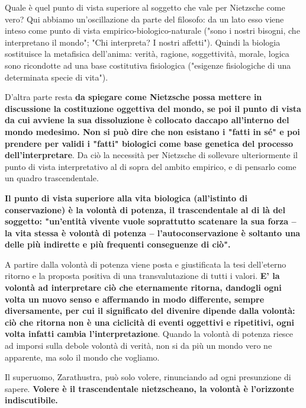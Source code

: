 Quale è quel punto di vista superiore al soggetto che vale per Nietzsche come vero? Qui abbiamo un'oscillazione da parte del filosofo: da un lato esso viene inteso come punto di vista empirico-biologico-naturale ("sono i nostri bisogni, che interpretano il mondo"; "Chi interpreta? I nostri affetti"). Quindi la biologia sostituisce la metafisica dell'anima: verità, ragione, soggettività, morale, logica sono ricondotte ad una base costitutiva fisiologica ("esigenze fisiologiche di una determinata specie di vita").

D'altra parte resta \textbf{da spiegare come Nietzsche possa mettere in discussione la costituzione oggettiva del mondo, se poi il punto di vista da cui avviene la sua dissoluzione è collocato daccapo all'interno del mondo medesimo. Non si può dire che non esistano i "fatti in sé" e poi prendere per validi i "fatti" biologici come base genetica del processo dell'interpretare}. Da ciò la necessità per Nietzsche di sollevare  ulteriormente il punto di vista interpretativo al di sopra del ambito empirico, e di pensarlo come un quadro trascendentale.

\textbf{Il punto di vista superiore alla vita biologica (all'istinto di conservazione) è la volontà di potenza, il trascendentale al di là del soggetto: "un'entità vivente vuole soprattutto scatenare la sua forza -- la vita stessa è volontà di potenza -- l'autoconservazione è soltanto una delle più indirette e più frequenti conseguenze di ciò".}

A partire dalla volontà di potenza viene posta e giustificata la tesi dell'eterno ritorno e la proposta positiva di una transvalutazione di tutti i valori. \textbf{E' la volontà ad interpretare ciò che eternamente ritorna, dandogli ogni volta un nuovo senso e affermando in modo differente, sempre diversamente, per cui il significato del divenire dipende dalla volontà: ciò che ritorna non è una ciclicità di eventi oggettivi e ripetitivi, ogni volta infatti cambia l'interpretazione}. Quando la volontà di potenza riesce ad imporsi sulla debole volontà di verità, non si da più un mondo vero ne apparente, ma solo il mondo che vogliamo.

Il superuomo, Zarathustra, può solo volere, rinunciando ad ogni presunzione di  sapere. \textbf{Volere è il trascendentale nietzscheano, la volontà è l'orizzonte indiscutibile.}



























